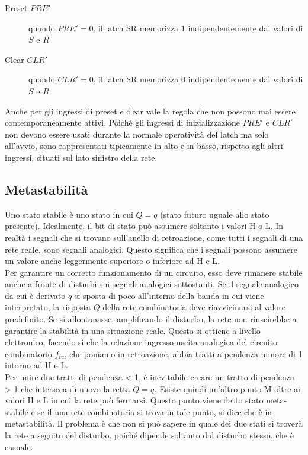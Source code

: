 \documentclass{article}
\begin{document}
\begin{description}
    \item[Preset $PRE'$] quando $PRE'=0$, il latch SR memorizza $1$ indipendentemente dai valori di $S$ e $R$
    \item[Clear $CLR'$] quando $CLR'=0$, il latch SR memorizza $0$ indipendentemente dai valori di $S$ e $R$
\end{description}

Anche per gli ingressi di preset e clear vale la regola che non possono mai essere contemporaneamente attivi.
Poiché gli ingressi di inizializzazione $PRE'$ e $CLR'$ non devono essere usati durante la normale operatività del latch ma solo all'avvio, sono rappresentati tipicamente in alto e in basso, rispetto agli altri ingressi, situati sul lato sinistro della rete.

\subsection{Metastabilità}

Uno stato stabile è uno stato in cui $Q=q$ (stato futuro uguale allo stato presente).
Idealmente, il bit di stato può assumere soltanto i valori H o L.
In realtà i segnali che si trovano sull'anello di retroazione, come tutti i segnali di una rete reale, sono segnali analogici.
Questo significa che i segnali possono assumere un valore anche leggermente superiore o inferiore ad H e L.\\

\noindent
Per garantire un corretto funzionamento di un circuito, esso deve rimanere stabile anche a fronte di disturbi sui segnali analogici sottostanti.
Se il segnale analogico da cui è derivato $q$ si sposta di poco all'interno della banda in cui viene interpretato, la risposta $Q$ della rete combinatoria deve riavvicinarsi al valore predefinito.
Se si allontanasse, amplificando il disturbo, la rete non riuscirebbe a garantire la stabilità in una situazione reale.
Questo si ottiene a livello elettronico, facendo si che la relazione ingresso-uscita analogica del circuito combinatorio $f_{rc}$, che poniamo in retroazione, abbia tratti a pendenza minore di 1 intorno ad H e L.\\

\noindent
Per unire due tratti di pendenza < 1, è inevitabile creare un tratto di pendenza > 1 che interseca di nuovo la retta $Q = q$.
Esiste quindi un'altro punto M oltre ai valori H e L in cui la rete può fermarsi.
Questo punto viene detto stato meta-stabile e se il una rete combinatoria si trova in tale punto, si dice che è in metastabilità.
Il problema è che non si può sapere in quale dei due stati si troverà la rete a seguito del disturbo, poiché dipende soltanto dal disturbo stesso, che è casuale.\\
\end{document}
